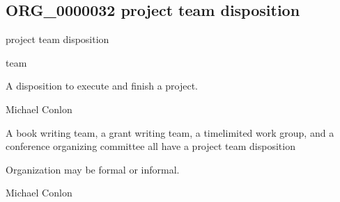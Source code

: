 \documentclass[letterpaper,10pt,english]{sphinxmanual}
\begin{document}
\subsection{ORG\_0000032 \sphinxhyphen{} project team disposition}
\label{\detokenize{doc-ORG_0000032:org-0000032-project-team-disposition}}\label{\detokenize{doc-ORG_0000032:index-0}}\label{\detokenize{doc-ORG_0000032::doc}}
\begin{sphinxShadowBox}

\sphinxAtStartPar
project team disposition
\end{sphinxShadowBox}

\begin{sphinxShadowBox}

\sphinxAtStartPar
team
\end{sphinxShadowBox}

\begin{sphinxShadowBox}

\sphinxAtStartPar
A disposition to execute and finish a project.
\end{sphinxShadowBox}

\begin{sphinxShadowBox}

\sphinxAtStartPar
Michael Conlon 
\end{sphinxShadowBox}

\begin{sphinxShadowBox}

\sphinxAtStartPar
A book writing team, a grant writing team, a time\sphinxhyphen{}limited work group, and a conference organizing committee all have a project team disposition
\end{sphinxShadowBox}

\begin{sphinxShadowBox}

\sphinxAtStartPar
Organization may be formal or informal.
\end{sphinxShadowBox}

\begin{sphinxShadowBox}

\sphinxAtStartPar
Michael Conlon 
\end{sphinxShadowBox}
\begin{quote}

\ignorespaces \end{quote}
\end{document}
